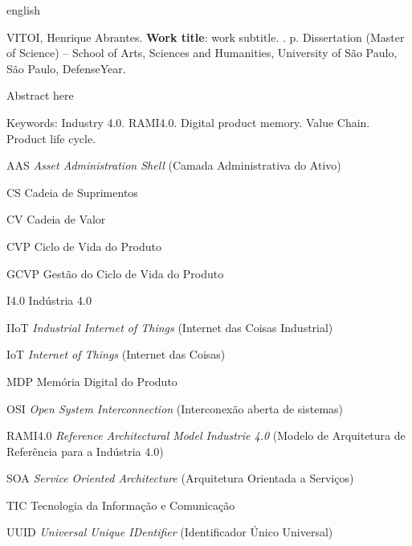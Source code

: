 \begin{resumo}[Abstract]
	\begin{otherlanguage*}{english}

		\begin{flushleft}
			VITOI, Henrique Abrantes. \textbf{Work title}: work subtitle. \imprimirdata. \pageref{LastPage} p. Dissertation (Master of Science) – School of Arts, Sciences and Humanities, University of São Paulo, São Paulo, DefenseYear. 
		\end{flushleft}
		Abstract here

		Keywords: Industry 4.0. RAMI4.0. Digital product memory. Value Chain. Product life cycle. 
	\end{otherlanguage*}
\end{resumo}

\listoffigures*
\cleardoublepage



\listoftables*
\cleardoublepage

\begin{siglas}
	\item[AAS] \textit{Asset Administration Shell} (Camada Administrativa do Ativo)
	\item[CS] Cadeia de Suprimentos
	\item[CV] Cadeia de Valor
	\item[CVP] Ciclo de Vida do Produto
	\item[GCVP] Gestão do Ciclo de Vida do Produto
	\item[I4.0] Indústria 4.0
	\item[IIoT] \textit{Industrial Internet of Things} (Internet das Coisas Industrial)
	\item[IoT] \textit{Internet of Things} (Internet das Coisas)
	\item[MDP] Memória Digital do Produto
	\item[OSI] \textit{Open System Interconnection} (Interconexão aberta de sistemas)
	\item[RAMI4.0] \textit{Reference Architectural Model Industrie 4.0} (Modelo de Arquitetura de Referência para a Indústria 4.0)
	\item[SOA] \textit{Service Oriented Architecture} (Arquitetura Orientada a Serviços)
  	\item[TIC] Tecnologia da Informação e Comunicação
  	\item[UUID] \textit{Universal Unique IDentifier} (Identificador Único Universal)
  	
  	
  	
\end{siglas}


\tableofcontents*
\cleardoublepage